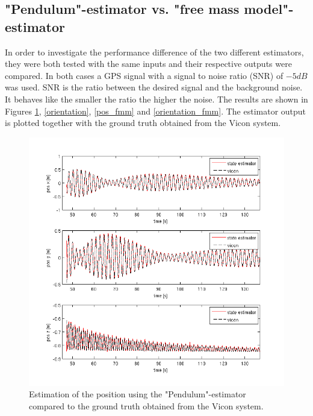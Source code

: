 \subsection{"Pendulum"-estimator vs. "free mass model"-estimator}\label{fmm}
In order to investigate the performance difference of the two different estimators, they were both tested with the same inputs and their respective outputs were compared. In both cases a GPS signal with a signal to noise ratio (SNR) of $-5 dB$ was used. SNR is the ratio between the desired signal and the background noise. It behaves like the smaller the ratio the higher the noise. The results are shown in Figures \ref{pos}, \ref{orientation}, \ref{pos_fmm} and \ref{orientation_fmm}. The estimator output is plotted together with the ground truth obtained from the Vicon system.
\begin{figure}[H]
\begin{center}
\includegraphics[width=1\textwidth]{pictures/2_2_SNR5_pos_GPS.png}
\caption{Estimation of the position using the "Pendulum"-estimator compared to the ground truth obtained from the Vicon system.}
\label{pos}
\end{center}
\end{figure}
